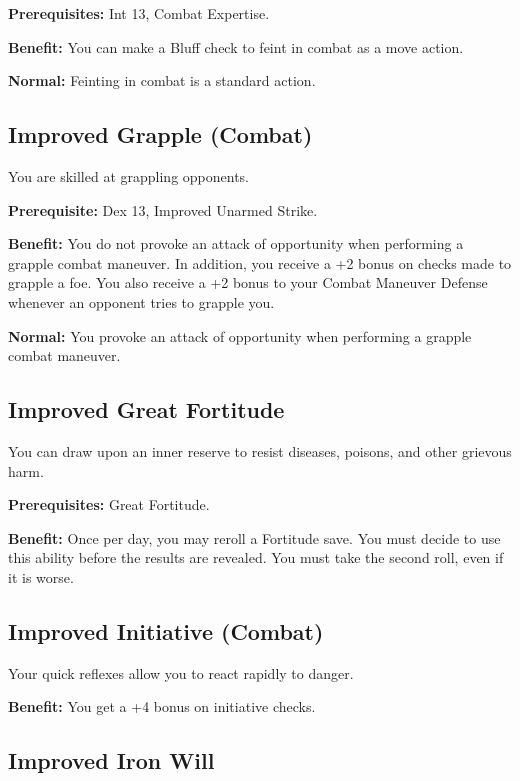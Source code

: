 \textbf{Prerequisites:} Int 13, Combat Expertise.
				
\textbf{Benefit:} You can make a Bluff check to feint in combat as a move action.
				
\textbf{Normal:} Feinting in combat is a standard action.
				
\subsection{Improved Grapple (Combat)}

				
You are skilled at grappling opponents.
				
\textbf{Prerequisite:} Dex 13, Improved Unarmed Strike.
				
\textbf{Benefit:} You do not provoke an attack of opportunity when performing a grapple combat maneuver. In addition, you receive a +2 bonus on checks made to grapple a foe. You also receive a +2 bonus to your Combat Maneuver Defense whenever an opponent tries to grapple you.
				
\textbf{Normal:} You provoke an attack of opportunity when performing a grapple combat maneuver.
				
\subsection{Improved Great Fortitude}

				
You can draw upon an inner reserve to resist diseases, poisons, and other grievous harm.
				
\textbf{Prerequisites:} Great Fortitude.
				
\textbf{Benefit:} Once per day, you may reroll a Fortitude save. You must decide to use this ability before the results are revealed. You must take the second roll, even if it is worse.
				
\subsection{Improved Initiative (Combat)}

				
Your quick reflexes allow you to react rapidly to danger.
				
\textbf{Benefit:} You get a +4 bonus on initiative checks.
				
\subsection{Improved Iron Will}

